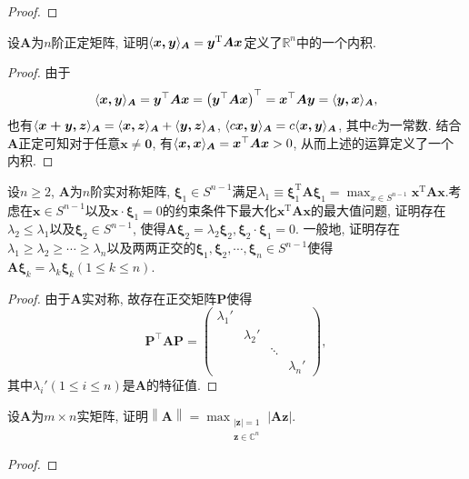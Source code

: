 \begin{quiza}
\begin{proof}
\end{proof}
\woe 设\(\boldsymbol{A}\)为\(n\)阶正定矩阵, 证明\(\langle \boldsymbol{x,y} \rangle_{\boldsymbol{A}}=\boldsymbol{y}^{\mathrm{T}}\boldsymbol{Ax}\)定义了\(\mathbb{R}^n\)中的一个内积.
\begin{proof}
由于\[\langle \boldsymbol{x,y} \rangle_{\boldsymbol{A}}=\boldsymbol{y}^{\top}\boldsymbol{Ax}=\left(\boldsymbol{y}^{\top}\boldsymbol{Ax}\right)^\top=\boldsymbol{x}^{\top}\boldsymbol{Ay}=\langle \boldsymbol{y,x} \rangle_{\boldsymbol{A}},\]也有\(\langle \boldsymbol{x+y,z} \rangle_{\boldsymbol{A}}=\langle \boldsymbol{x,z} \rangle_{\boldsymbol{A}}+\langle \boldsymbol{y,z} \rangle_{\boldsymbol{A}}\), \(\langle c\boldsymbol{x,y} \rangle_{\boldsymbol{A}}=c\langle \boldsymbol{x,y} \rangle_{\boldsymbol{A}}\), 其中\(c\)为一常数. 结合\(\boldsymbol{A}\)正定可知对于任意\(\boldsymbol{x}\ne\boldsymbol{0}\), 有\(\langle \boldsymbol{x,x} \rangle_{\boldsymbol{A}}=\boldsymbol{x}^\top\boldsymbol{Ax}>0\), 从而上述的运算定义了一个内积.
\end{proof}
\woe 设\(n\geqslant 2\), \(\boldsymbol{A}\)为\(n\)阶实对称矩阵, \(\boldsymbol{\xi}_1\in S^{n-1}\)满足\(\lambda_1\equiv \boldsymbol{\xi}_1^{\mathrm{T}}\boldsymbol{A}\boldsymbol{\xi}_1=\max_{x\in S^{n-1}}\boldsymbol{x}^{\mathrm{T}}\boldsymbol{A}\boldsymbol{x}.\)考虑在\(\boldsymbol{x}\in S^{n-1}\)以及\(\boldsymbol{x}\cdot\boldsymbol{\xi}_1=0\)的约束条件下最大化\(\boldsymbol{x}^{\mathrm{T}}\boldsymbol{A}\boldsymbol{x}\)的最大值问题, 证明存在\(\lambda_2\leqslant\lambda_1\)以及\(\boldsymbol{\xi}_2\in S^{n-1}\), 使得\(\boldsymbol{A\xi}_2=\lambda_2\boldsymbol{\xi}_2,\boldsymbol{\xi}_2\cdot\boldsymbol{\xi}_1=0\). 一般地, 证明存在\(\lambda_1\geqslant \lambda_2\geqslant\cdots\geqslant\lambda_n\)以及两两正交的\(\boldsymbol{\xi}_1,\boldsymbol{\xi}_2,\cdots,\boldsymbol{\xi}_n\in S^{n-1}\)使得\(\boldsymbol{A}\boldsymbol{\xi}_k=\lambda_k\boldsymbol{\xi}_k(1\leqslant k\leqslant n)\).
\begin{proof}
由于\(\boldsymbol{A}\)实对称, 故存在正交矩阵\(\boldsymbol{P}\)使得\[\boldsymbol{P}^\top\boldsymbol{AP}=\left(\begin{matrix}
\lambda_1'&&&\\
&\lambda_2'&&\\
&&\ddots&\\
&&&\lambda_n'
\end{matrix}\right),\]其中\(\lambda_i'(1\leqslant i\leqslant n)\)是\(\boldsymbol{A}\)的特征值.
\end{proof}
\woe 设\(\boldsymbol{A}\)为\(m\times n\)实矩阵, 证明\(\left\|\boldsymbol{A}\right\|=\max_{\substack{|\boldsymbol{z}|=1\\ \boldsymbol{z}\in\mathbb{C}^{n}}}|\boldsymbol{Az}|\).
\begin{proof}


\end{proof}
\end{quiza}
